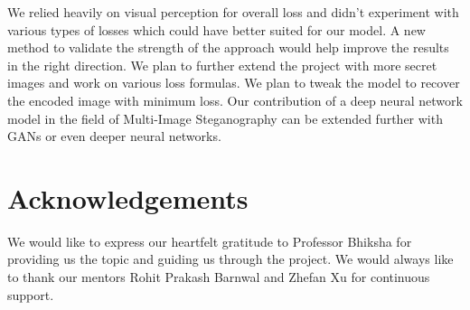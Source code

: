 \documentclass{article}
\begin{document}
We relied heavily on visual perception for overall loss and didn't experiment with various types of losses which could have better suited for our model. A new method to validate the strength of the approach would help improve the results in the right direction. We plan to further extend the project with more secret images and work on various loss formulas. We plan to tweak the model to recover the encoded image with minimum loss. Our contribution of a deep neural network model in the field of Multi-Image Steganography can be extended further with GANs or even deeper neural networks.


\section{Acknowledgements}
We would like to express our heartfelt gratitude to Professor Bhiksha for providing us the topic and guiding us through the project. We would always like to thank our mentors Rohit Prakash Barnwal and Zhefan Xu for continuous support.


\FloatBarrier



\end{document}
